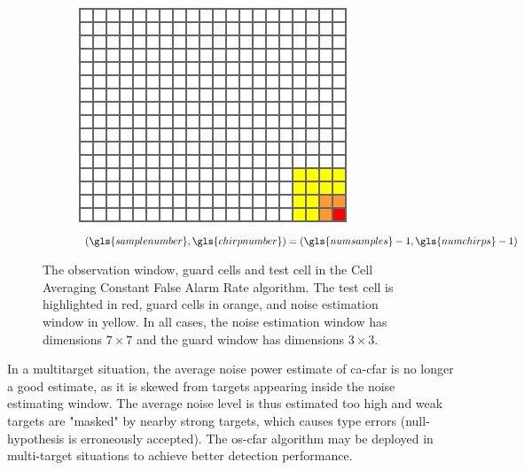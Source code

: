 \begin{figure}
\begin{subfigure}[b]{0.3\textwidth}
    \end{subfigure}
    \hfill
    \begin{subfigure}[b]{0.3\textwidth}
        \centering
        \includegraphics[width=\textwidth]{fig/4/ca-cfar-window-3.pdf}
        \caption{$(\gls{samplenumber}, \gls{chirpnumber}) = (\gls{numsamples}-1, \gls{numchirps}-1)$}
    \end{subfigure}
    \caption{
        The observation window, guard cells and test cell in the Cell Averaging Constant False Alarm Rate algorithm.
        The test cell is highlighted in red, guard cells in orange, and noise estimation window in yellow.
        In all cases, the noise estimation window has dimensions $7 \times 7$ and the guard window has dimensions $3 \times 3$.
    }
    \label{fig:ca-cfar-window}
\end{figure}

In a multitarget situation, the average noise power estimate of \gls{ca}-\gls{cfar} is no longer a good estimate,
as it is skewed from targets appearing inside the noise estimating window.
The average noise level is thus estimated too high and weak targets are "masked" by nearby strong targets,
which causes type  errors (\gls{null-hypothesis} is erroneously accepted).
The \gls{os}-\gls{cfar} algorithm may be deployed in multi-target situations to achieve better detection performance.~\cite{nato-radar-topics}

